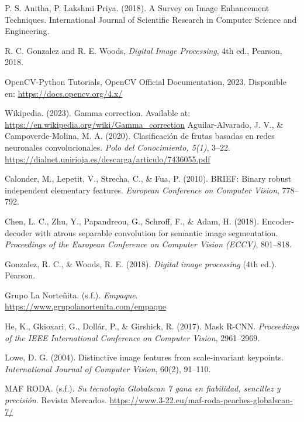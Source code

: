 \documentclass[12pt,letterpaper]{article}
\begin{document}
\begin{thebibliography}{99}

P. S. Anitha, P. Lakshmi Priya. (2018). A Survey on Image Enhancement Techniques. International Journal of Scientific Research in Computer Science and Engineering.

R. C. Gonzalez and R. E. Woods, \textit{Digital Image Processing}, 4th ed., Pearson, 2018.

OpenCV-Python Tutorials, OpenCV Official Documentation, 2023. Disponible en: \url{https://docs.opencv.org/4.x/}

Wikipedia. (2023). Gamma correction. Available at: \url{https://en.wikipedia.org/wiki/Gamma_correction}
Aguilar-Alvarado, J. V., \& Campoverde-Molina, M. A. (2020). Clasificación de frutas basadas en redes neuronales convolucionales. \textit{Polo del Conocimiento, 5(1)}, 3–22. \url{https://dialnet.unirioja.es/descarga/articulo/7436055.pdf}

Calonder, M., Lepetit, V., Strecha, C., \& Fua, P. (2010). BRIEF: Binary robust independent elementary features. \textit{European Conference on Computer Vision}, 778--792.

Chen, L. C., Zhu, Y., Papandreou, G., Schroff, F., \& Adam, H. (2018). Encoder-decoder with atrous separable convolution for semantic image segmentation. \textit{Proceedings of the European Conference on Computer Vision (ECCV)}, 801--818.

Gonzalez, R. C., \& Woods, R. E. (2018). \textit{Digital image processing} (4th ed.). Pearson.

Grupo La Norteñita. (s.f.). \textit{Empaque}. \url{https://www.grupolanortenita.com/empaque}

He, K., Gkioxari, G., Dollár, P., \& Girshick, R. (2017). Mask R-CNN. \textit{Proceedings of the IEEE International Conference on Computer Vision}, 2961--2969.

Lowe, D. G. (2004). Distinctive image features from scale-invariant keypoints. \textit{International Journal of Computer Vision}, 60(2), 91--110.

MAF RODA. (s.f.). \textit{Su tecnología Globalscan 7 gana en fiabilidad, sencillez y precisión}. Revista Mercados. \url{https://www.3-22.eu/maf-roda-peaches-globalscan-7/}


\end{thebibliography}
\end{document}
